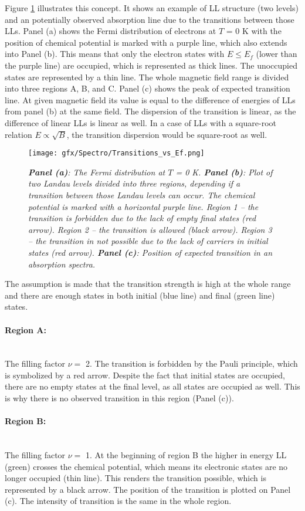 \documentclass[titlepage,a4paper]{book}
\newcommand{\wciecie}{\quad\phantom{v}}
\newcommand{\myparagraph}[1]{\paragraph{#1}\mbox{}\\}
\begin{document}
Figure \ref{fig:Transitions_vs_Ef} illustrates this concept. It shows an example of LL structure (two levels) and an potentially observed absorption line due to the transitions between those LLs. Panel (a) shows the Fermi distribution of electrons at $T$ = 0 K with the position of chemical potential is marked with a purple line, which also extends into Panel (b). This means that only the electron states with $E \leq E_f$ (lower than the purple line) are occupied, which is represented as thick lines. The unoccupied states are represented by a thin line. The whole magnetic field range is divided into three regions A, B, and C. Panel (c) shows the peak of expected transition line. At given magnetic field its value is equal to the difference of energies of LLs from panel (b) at the same field. The dispersion of the transition is linear, as the difference of linear LLs is linear as well. In a case of LLs with a square-root relation $E \propto \sqrt{B}$, the transition dispersion would be square-root as well. 

\begin{figure}[ht]
	\centering
	\texttt{[image: gfx/Spectro/Transitions\_vs\_Ef.png]}
	\vspace{-10pt}
	\caption{\textit{\textbf{Panel (a)}: The Fermi distribution at $T$ = 0 K. \textbf{Panel (b)}: Plot of two Landau levels divided into three regions, depending if a transition between those Landau levels can occur. The chemical potential is marked with a horizontal purple line. Region 1 -- the transition is forbidden due to the lack of empty final states (red arrow). Region 2 -- the transition is allowed (black arrow). Region 3 -- the transition in not possible due to the lack of carriers in initial states (red arrow). \textbf{Panel (c)}: Position of expected transition in an absorption spectra.}}
	\label{fig:Transitions_vs_Ef}
\end{figure}

The assumption is made that the transition strength is high at the whole range and there are enough states in both initial (blue line) and final (green line) states. 

\myparagraph{Region A:}
\wciecie
The filling factor $\nu =$ 2. The transition is forbidden by the Pauli principle, which is symbolized by a red arrow. Despite the fact that initial states are occupied, there are no empty states at the final level, as all states are occupied as well. This is why there is no observed transition in this region (Panel (c)).

\myparagraph{Region B:}
\wciecie
The filling factor $\nu =$ 1. At the beginning of region B the higher in energy LL (green) crosses the chemical potential, which means its electronic states are no longer occupied (thin line). This renders the transition possible, which is represented by a black arrow. The position of the transition is plotted on Panel (c). The intensity of transition is the same in the whole region.
\end{document}
